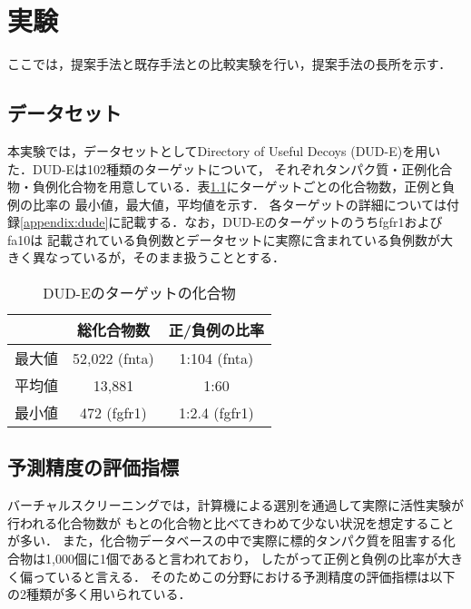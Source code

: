 \chapter{実験}
ここでは，提案手法と既存手法との比較実験を行い，提案手法の長所を示す．


\section{データセット}
本実験では，データセットとしてDirectory of Useful Decoys (DUD-E)\cite{Mysinger2012}を用いた．DUD-Eは102種類のターゲットについて，
それぞれタンパク質・正例化合物・負例化合物を用意している．表\ref{table:dude}にターゲットごとの化合物数，正例と負例の比率の
最小値，最大値，平均値を示す．
各ターゲットの詳細については付録\ref{appendix:dude}に記載する．なお，DUD-Eのターゲットのうちfgfr1およびfa10は
記載されている負例数とデータセットに実際に含まれている負例数が大きく異なっているが，そのまま扱うこととする．

\begin{table}[htb] \centering
	\caption{DUD-Eのターゲットの化合物}
	\label {table:dude}
	\begin{tabular}{c|cc}
	\hline
			&総化合物数		&正/負例の比率	\\ \hline
	最大値	&52,022 (fnta)		&1:104 (fnta)		\\
	平均値	&13,881			&1:60			\\
	最小値	&472 (fgfr1)		&1:2.4 (fgfr1)		\\ \hline
	\end{tabular}
\end{table}

	
\section{予測精度の評価指標}
バーチャルスクリーニングでは，計算機による選別を通過して実際に活性実験が行われる化合物数が
もとの化合物と比べてきわめて少ない状況を想定することが多い．
また，化合物データベースの中で実際に標的タンパク質を阻害する化合物は1,000個に1個であると言われており，
したがって正例と負例の比率が大きく偏っていると言える．
そのためこの分野における予測精度の評価指標は以下の2種類が多く用いられている．

